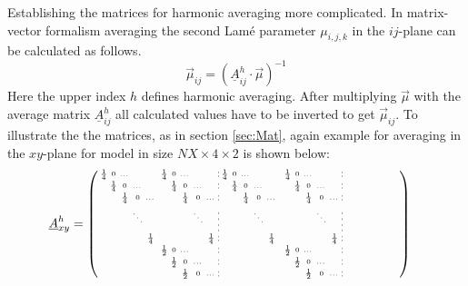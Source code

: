 \documentclass[pdftex,a4paper,parskip,listof=totoc,bibliography=totoc,onehalfspacing,12pt]{scrreprt}
\newcommand*\dashline{\hspace{-0.3em}\rotatebox[origin=c]{90}{\scalebox{-0.3}[1]{$-~~-$}}\hspace{-0.3em}}
\newcommand*\longdashline{\hspace{-0.3em}\rotatebox[origin=c]{90}{\scalebox{-0.4}[1]{$-~~-~~-~~-$}}\hspace{-0.3em}}
\begin{document}
Establishing the matrices for harmonic averaging more complicated. In matrix-vector formalism averaging the second Lam\'{e} parameter $\mu_{i,j,k}$ in the $ij$-plane can be calculated as follows.
\begin{equation*}
\vec{\mu}_{ij}=\left(\underline{A}^{h}_{ij} \cdot\vec{\mu}	\right)^{-1}
\end{equation*}
Here the upper index $h$ defines harmonic averaging. After multiplying $\vec{\mu}$ with the average matrix $\underline{A}^{h}_{ij}$ all calculated values have to be inverted to get $\vec{\mu}_{ij}$.
To illustrate the the matrices, as in section \ref{sec:Mat}, again example for averaging in the $xy$-plane for model in size $NX\times 4 \times 2$ is shown below: 
\begin{align*}
	\underline{A}^{h}_{xy} &= \tiny\begin{psmallmatrix}
	\frac{1}{4} & 0 & \dots   & &   &&  \frac{1}{4} & 0 & \dots   & &   &\dashline&  \frac{1}{4} & 0 & \dots   & &   &&  & \frac{1}{4} & 0 & \dots & & &\dashline& & & && & & & & && & & && & && & & & & \\
  	& \frac{1}{4} & 0 & \dots &   &&   & \frac{1}{4} & 0 & \dots &   &\dashline&   & \frac{1}{4} & 0 & \dots &   &&   & & \frac{1}{4} & 0 & \dots & &\dashline  & & & && & & & & && && & & & && & & & & \\
    & & \frac{1}{4} & 0 & \dots    &&  &  & \frac{1}{4} & 0 & \dots    &\dashline&   & & \frac{1}{4} & 0 & \dots   &&  &  &  & \frac{1}{4} & 0 & \dots &\dashline & & & && & & & & && & && & & && & & & & \\
   	& &  & \ddots &     &&  &  & & \ddots &   &\longdashline& &   & &  \ddots &  &    &&  &  & & \ddots &   &\longdashline& & & & && & & & & &&& & & & & && & & & & \\
    & & & & \frac{1}{4} &&  & & & & \frac{1}{4} &\dashline& & & & & \frac{1}{4} && & & & & & \frac{1}{4}  &\dashline & & & &&& & & & & && & & & & && & & & & \\
    &   &     & &   &&  \frac{1}{2} & 0 & \dots   & &   &\dashline&    &   &     & &   &&  & \frac{1}{2} & 0 & \dots & &   & \dashline& & && && & & & & && & & & & && & & & & \\
 	& &   &  &   &&   & \frac{1}{2} & 0 & \dots &   &\dashline&   &   &   &   &   &&   & & \frac{1}{2} & 0 & \dots && \dashline& & & && && & & & && & & & & && & & & & \\
   	& &   &   &      &&  &  & \frac{1}{2} & 0 & \dots    &\dashline&   & &   &   &     &&  &  &  & \frac{1}{2} & 0 & \dots&\dashline & & && && & & & & && & & & & && & & & & \\

\end{psmallmatrix}
\end{align*}
\end{document}
